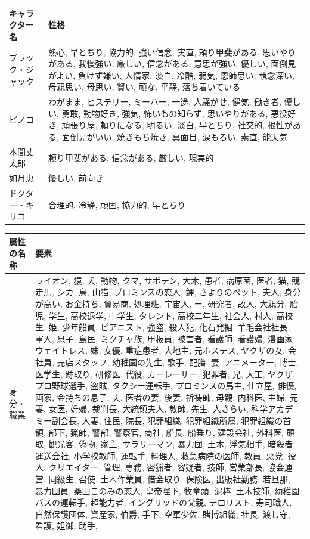 \documentclass[a4j,12pt]{jsreport}
\begin{document}
\setlongtables
\begin{tabularx}{\textwidth}{lX}
   \caption{既存キャラクターの設定（その3） \label{chara_setting_list3}}
   \vspace*{-5pt}
   \endfirsthead
   \hline
   キャラクター名 & 性格 \\
   \hline
   ブラック・ジャック & 熱心, 早とちり, 協力的, 強い信念, 実直, 頼り甲斐がある, 思いやりがある, 我慢強い, 厳しい, 信念がある, 意思が強い, 優しい, 面倒見がよい, 負けず嫌い, 人情家, 淡白, 冷酷, 弱気, 恩師思い, 執念深い, 母親思い, 母思い, 賢い, 頑な, 平静, 落ち着いている \\
   ピノコ & わがまま, ヒステリー, ミーハー, 一途, 人騒がせ, 健気, 働き者, 優しい, 勇敢, 動物好き, 強気, 怖いもの知らず, 思いやりがある, 悪役好き, 頑張り屋, 頼りになる, 明るい, 淡白, 早とちり, 社交的, 根性がある, 面倒見がいい, 焼きもち焼き, 真面目, 涙もろい, 素直, 能天気 \\
   本間丈太郎 & 頼り甲斐がある, 信念がある, 厳しい, 現実的 \\
   如月恵 & 優しい, 前向き \\
   ドクター・キリコ & 合理的, 冷静, 頑固, 協力的, 早とちり \\
   \hline
\end{tabularx}



\setlongtables
\begin{tabularx}{\textwidth}{l|X}
   \caption{新規キャラクターの属性 \label{chara_setting_list4}}
   \vspace*{-5pt}
   \endfirsthead
   \hline
   属性の名称 & 要素  \\
   \hline
   身分・職業 & ライオン, 猿, 犬, 動物, クマ, サボテン, 大木, 患者, 病原菌, 医者, 猫, 競走馬, シカ, 鳥, 山猫, プロミンスの恋人, 鯉, さよりのペット, 夫人, 身分が高い, お金持ち, 貿易商, 処理班, 宇宙人, ー, 研究者, 故人, 大親分, 胎児, 学生, 高校退学, 中学生, タレント, 高校二年生, 社会人, 村人, 高校生, 姫, 少年船員, ピアニスト, 強盗, 殺人犯, 化石発掘, 羊毛会社社長, 軍人, 息子, 島民, ミクチャ族, 甲板員, 被害者, 看護師, 看護婦, 漫画家, ウェイトレス, 妹, 女優, 重症患者, 大地主, 元ホステス, ヤクザの女, 会社員, 売店スタッフ, 幼稚園の先生, 歌手, 配膳, 妻, アニメーター, 博士, 医学生, 跡取り, 研修医, 代役, カーレーサー, 犯罪者, 兄, 大工, ヤクザ, プロ野球選手, 盗賊, タクシー運転手, プロミンスの馬主, 仕立屋, 俳優, 画家, 金持ちの息子, 夫, 医者の妻, 後妻, 祈祷師, 母親, 内科医, 主婦, 元妻, 女医, 妊婦, 裁判長, 大統領夫人, 教師, 先生, 人さらい, 科学アカデミー副会長, 人妻, 住民, 院長, 犯罪組織, 犯罪組織所属, 犯罪組織の首領, 部下, 猟師, 警部, 警察官, 商社, 船長, 船乗り, 建設会社, 外科医, 頭取, 観光客, 偽物, 家主, サラリーマン, 暴力団, 土木, 浮気相手, 暗殺者, 運送会社, 小学校教師, 運転手, 料理人, 救急病院の医師, 教員, 悪党, 役人, クリエイター, 管理, 専務, 密猟者, 容疑者, 技師, 営業部長, 協会運営, 同級生, 召使, 土木作業員, 借金取り, 保険医, 出版社勤務, 若旦那, 暴力団員, 桑田このみの恋人, 皇帝陛下, 牧童頭, 泥棒, 土木技師, 幼稚園バスの運転手, 超能力者, イングリッドの父親, テロリスト, 寿司職人, 自然保護団体, 資産家, 伯爵, 手下, 空軍少佐, 賭博組織, 社長, 渡し守, 看護, 姐御, 助手, \\
\end{tabularx} 
\end{document}

